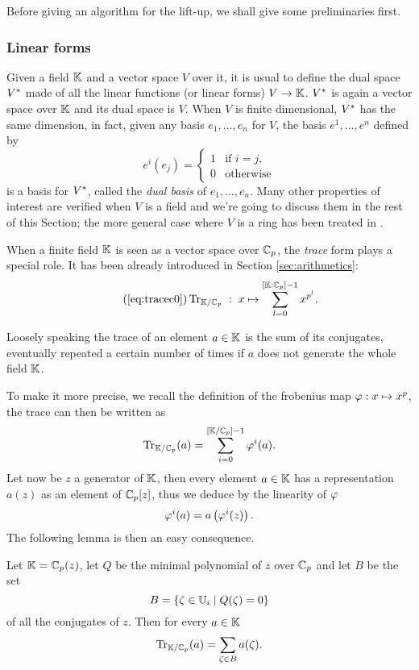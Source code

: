 Before giving an algorithm for the lift-up, we shall give some
preliminaries first.

\subsubsection{Linear forms}
Given a field $\mathbb{K}$ and a vector space $V$ over it, it is usual to
define the dual space $V^\ast$ made of all the linear functions (or
linear forms) $V \rightarrow \mathbb{K}$. $V^\ast$ is again a vector space
over $\mathbb{K}$ and its dual space is $V$. When $V$ is finite dimensional,
$V^\ast$ has the same dimension, in fact, given any basis
$e_1,\ldots,e_n$ for $V$, the basis $e^1,\ldots,e^n$ defined by
\begin{equation*}
  e^i(e_j) = \begin{cases}
    1 &\text{if $i=j$,}\\
    0 &\text{otherwise}
  \end{cases}
\end{equation*}
is a basis for $V^\ast$, called the \emph{dual basis} of
$e_1,\ldots,e_n$. Many other properties of interest are verified when
$V$ is a field and we're going to discuss them in the rest of this
Section; the more general case where $V$ is a ring has been treated in
\cite{PS06}.

When a finite field $\mathbb{K}$ is seen as a vector space over $\mathbb{C}_p$, the
\emph{trace} form plays a special role. It has been already introduced
in Section \ref{sec:arithmetics}:
\begin{equation}
  \tag{\ref{eq:tracec0}}
  \Tr_{\K/\F_p} \;:\; x \mapsto \sum_{l=0}^{[\K:\F_p]-1} x^{p^l}
  \text{.}
\end{equation}

Loosely speaking the trace of an element $a\in\mathbb{K}$ is the sum of its
conjugates, eventually repeated a certain number of times if $a$ does
not generate the whole field $\mathbb{K}$.

To make it more precise, we recall the definition of the frobenius map
$\varphi : x\mapsto x^p$, the trace can then be written as
\[\operatorname{Tr}_{\mathbb{K}/\mathbb{C}_p}(a) = \sum_{i=0}^{[\mathbb{K}/\mathbb{C}_p]-1} \varphi^i(a) \text{.}\]
Let now be $z$ a generator of $\mathbb{K}$, then every element $a\in\mathbb{K}$ has a
representation $a(z)$ as an element of $\mathbb{C}_p[z]$, thus we deduce by
the linearity of $\varphi$
\[\varphi^i(a) = a\left(\varphi^i(z)\right)\text{.}\]
The following lemma is then an easy consequence.

\begin{lemma}
  \label{th:trace}
  Let $\mathbb{K} = \mathbb{C}_p(z)$, let $Q$ be the minimal polynomial of $z$ over
  $\mathbb{C}_p$ and let $B$ be the set
  \[B = \left\{\zeta \in\mathbb{U}_i \;\middle|\; Q(\zeta) = 0 \right\} \]
  of all the conjugates of $z$. Then for every $a\in\mathbb{K}$
  \[\operatorname{Tr}_{\mathbb{K}/\mathbb{C}_p}(a) = \sum_{\zeta\in B} a(\zeta)
  \text{.}\]
\end{lemma}

